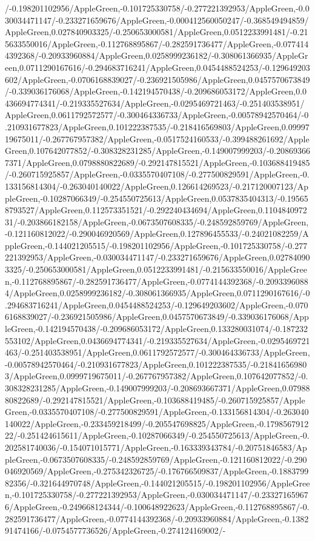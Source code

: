 {\begin{tikzternal}
{/-0.198201102956/AppleGreen,-0.101725330758/-0.277221392953/AppleGreen,-0.030034471147/-0.233271659676/AppleGreen,-0.000412560050247/-0.368549494859/AppleGreen,0.027840903325/-0.250653000581/AppleGreen,0.0512233991481/-0.215633550016/AppleGreen,-0.112768895867/-0.282591736477/AppleGreen,-0.0774144392368/-0.20933960884/AppleGreen,0.0258999236182/-0.308061366935/AppleGreen,0.0711290167616/-0.294683716241/AppleGreen,0.0454488524253/-0.129649203602/AppleGreen,-0.0706168839027/-0.236921505986/AppleGreen,0.0457570673849/-0.339036176068/AppleGreen,-0.142194570438/-0.209686053172/AppleGreen,0.0436694774341/-0.219335527634/AppleGreen,-0.0295469721463/-0.251403538951/AppleGreen,0.0611792572577/-0.300464336733/AppleGreen,-0.00578942570464/-0.210931677823/AppleGreen,0.101222387535/-0.218416569803/AppleGreen,0.0999719675011/-0.267767957382/AppleGreen,-0.0517524160533/-0.399488261692/AppleGreen,0.107642077852/-0.308328231285/AppleGreen,-0.149007999203/-0.208693667371/AppleGreen,0.0798880822689/-0.292147815521/AppleGreen,-0.103688419485/-0.260715925857/AppleGreen,-0.0335570407108/-0.277500829591/AppleGreen,-0.133156814304/-0.263040140022/AppleGreen,0.126614269523/-0.217120007123/AppleGreen,-0.10287066349/-0.254550725613/AppleGreen,0.0537835404313/-0.195658793527/AppleGreen,0.112573351521/-0.292240434694/AppleGreen,0.110484097231/-0.203866182158/AppleGreen,-0.0673507608335/-0.248592859769/AppleGreen,-0.121160812022/-0.290046920569/AppleGreen,0.127896455533/-0.24021082259/AppleGreen,-0.144021205515/-0.198201102956/AppleGreen,-0.101725330758/-0.277221392953/AppleGreen,-0.030034471147/-0.233271659676/AppleGreen,0.027840903325/-0.250653000581/AppleGreen,0.0512233991481/-0.215633550016/AppleGreen,-0.112768895867/-0.282591736477/AppleGreen,-0.0774144392368/-0.20933960884/AppleGreen,0.0258999236182/-0.308061366935/AppleGreen,0.0711290167616/-0.294683716241/AppleGreen,0.0454488524253/-0.129649203602/AppleGreen,-0.0706168839027/-0.236921505986/AppleGreen,0.0457570673849/-0.339036176068/AppleGreen,-0.142194570438/-0.209686053172/AppleGreen,0.133280031074/-0.187232553102/AppleGreen,0.0436694774341/-0.219335527634/AppleGreen,-0.0295469721463/-0.251403538951/AppleGreen,0.0611792572577/-0.300464336733/AppleGreen,-0.00578942570464/-0.210931677823/AppleGreen,0.101222387535/-0.218416569803/AppleGreen,0.0999719675011/-0.267767957382/AppleGreen,0.107642077852/-0.308328231285/AppleGreen,-0.149007999203/-0.208693667371/AppleGreen,0.0798880822689/-0.292147815521/AppleGreen,-0.103688419485/-0.260715925857/AppleGreen,-0.0335570407108/-0.277500829591/AppleGreen,-0.133156814304/-0.263040140022/AppleGreen,-0.233459218499/-0.205547698825/AppleGreen,-0.179856791222/-0.251424615611/AppleGreen,-0.10287066349/-0.254550725613/AppleGreen,-0.202581740036/-0.154071015771/AppleGreen,-0.163339343784/-0.20751846583/AppleGreen,-0.0673507608335/-0.248592859769/AppleGreen,-0.121160812022/-0.290046920569/AppleGreen,-0.275342326725/-0.176766509837/AppleGreen,-0.188379982356/-0.321644970748/AppleGreen,-0.144021205515/-0.198201102956/AppleGreen,-0.101725330758/-0.277221392953/AppleGreen,-0.030034471147/-0.233271659676/AppleGreen,-0.249668124344/-0.100648922623/AppleGreen,-0.112768895867/-0.282591736477/AppleGreen,-0.0774144392368/-0.20933960884/AppleGreen,-0.138291474166/-0.0754577736526/AppleGreen,-0.274124169002/-}
\end{tikzternal}}
